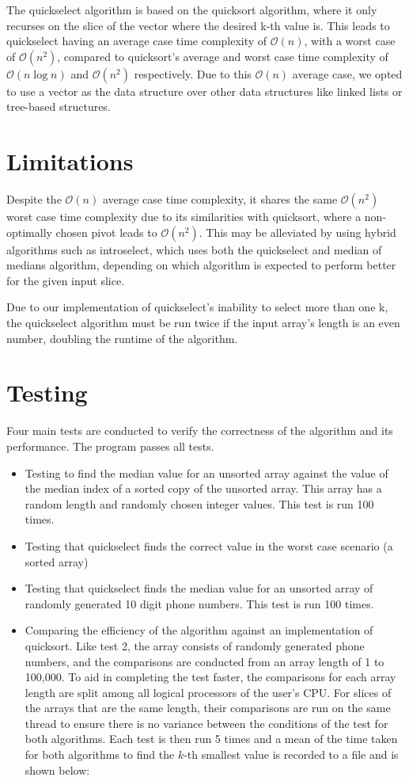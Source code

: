 \documentclass{report}
\begin{document}
The quickselect algorithm is based on the quicksort algorithm, where it only recurses on the slice of the vector where the desired k-th value is. This leads to quickselect having an average case time complexity of \(\mathcal{O}(n)\), with a worst case of \(\mathcal{O}(n^2)\), compared to quicksort's average and worst case time complexity of \(\mathcal{O}(n \log{n})\) and \(\mathcal{O}(n^2)\) respectively. Due to this \(\mathcal{O}(n)\) average case, we opted to use a vector as the data structure over other data structures like linked lists or tree-based structures.

\section{Limitations}
Despite the \(\mathcal{O}(n)\) average case time complexity, it shares the same \(\mathcal{O}(n^2)\) worst case time complexity due to its similarities with quicksort, where a non-optimally chosen pivot leads to \(\mathcal{O}(n^2)\). This may be alleviated by using hybrid algorithms such as introselect, which uses both the quickselect and median of medians algorithm, depending on which algorithm is expected to perform better for the given input slice.

Due to our implementation of quickselect's inability to select more than one k, the quickselect algorithm must be run twice if the input array's length is an even number, doubling the runtime of the algorithm.

\section{Testing}
Four main tests are conducted to verify the correctness of the algorithm and its performance. The program passes all tests.
\begin{itemize}
	\item Testing to find the median value for an unsorted array against the value of the median index of a sorted copy of the unsorted array. This array has a random length and randomly chosen integer values. This test is run 100 times.
	\item Testing that quickselect finds the correct value in the worst case scenario (a sorted array)
	\item Testing that quickselect finds the median value for an unsorted array of randomly generated 10 digit phone numbers. This test is run 100 times.
	\item Comparing the efficiency of the algorithm against an implementation of quicksort. Like test 2, the array consists of randomly generated phone numbers, and the comparisons are conducted from an array length of 1 to 100,000. To aid in completing the test faster, the comparisons for each array length are split among all logical processors of the user's CPU. For slices of the arrays that are the same length, their comparisons are run on the same thread to ensure there is no variance between the conditions of the test for both algorithms. Each test is then run 5 times and a mean of the time taken for both algorithms to find the \(k\)-th smallest value is recorded to a file and is shown below:
\end{itemize}
\end{document}
